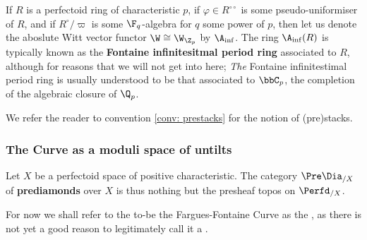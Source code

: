             \begin{convention} \label{conv: A_inf}
                If $R$ is a perfectoid ring of characteristic $p$, if $\varphi \in R^{\circ \circ}$ is some pseudo-uniformiser of $R$, and if $R^{\circ}/\varpi$ is some $\F_q$-algebra for $q$ some power of $p$, then let us denote the aboslute Witt vector functor $\W \cong \W_{\Z_p}$ by $\A_{\inf}$. The ring $\A_{\inf}(R)$ is typically known as the \textbf{Fontaine infinitesitmal period ring} associated to $R$, although for reasons that we will not get into here; \textit{The} Fontaine infinitestimal period ring is usually understood to be that associated to $\bbC_p$, the completion of the algebraic closure of $\Q_p$.
            \end{convention}
            
            We refer the reader to convention \ref{conv: prestacks} for the notion of (pre)stacks.
            \subsubsection{The Curve as a moduli space of untilts}
                \begin{definition}[Prediamonds] \label{def: prediamonds}
                    Let $X$ be a perfectoid space of positive characteristic. The category $\Pre\Dia_{/X}$ of \textbf{prediamonds} over $X$ is thus nothing but the presheaf topos on $\Perfd_{/X}$.
                \end{definition}
                
                For now we shall refer to the to-be the Fargues-Fontaine Curve as the , as there is not yet a good reason to legitimately call it a .
                \begin{definition} \label{def: the_frobenius_space}
                    
                \end{definition}
                
                \begin{definition} \label{def: the_fargues_fontaine_space}
                    
                \end{definition}
                \begin{remark} \label{remark: tilting_the_fargues_fontaine_space}
                    
                \end{remark}
                
